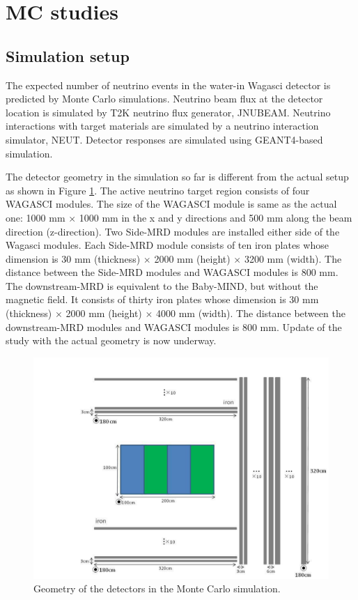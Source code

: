\section{MC studies}
\label{sec:mc_study}
\subsection{Simulation setup}
The expected number of neutrino events in the water-in Wagasci detector
is predicted by Monte Carlo simulations.
Neutrino beam flux at the detector location is simulated by T2K neutrino flux generator, JNUBEAM. Neutrino interactions with target materials are simulated by a neutrino interaction simulator, NEUT. Detector responses are simulated using GEANT4-based simulation.


The detector geometry in the simulation so far is different from the actual setup as shown in Figure \ref{fig:wagasci_mc_geometry}.
The active neutrino target region consists of four WAGASCI modules.
The size of the WAGASCI module is same as the actual one: 1000 mm $\times$ 1000 mm in the x and y directions and 500 mm along the beam direction (z-direction).
Two Side-MRD modules are installed either side of the Wagasci modules.
Each Side-MRD module consists of ten iron plates whose dimension is 30 mm (thickness) $\times$ 2000 mm (height) $\times$ 3200 mm (width). 
The distance between the Side-MRD modules and WAGASCI modules is 800 mm.
The downstream-MRD is equivalent to the Baby-MIND, but without the magnetic field.
It consists of thirty iron plates whose dimension is  30 mm (thickness) $\times$ 2000 mm (height) $\times$ 4000 mm (width).
The distance between the downstream-MRD modules and WAGASCI modules is 800 mm.
Update of the study with the actual geometry is now underway.

\begin{figure}[tbhp]
\begin{center}
\includegraphics[width=0.8\linewidth]{fig/wagasci_mc_geometry.pdf}
\end{center}
\caption{
Geometry of the detectors in the Monte Carlo simulation.}
\label{fig:wagasci_mc_geometry}
\end{figure}


